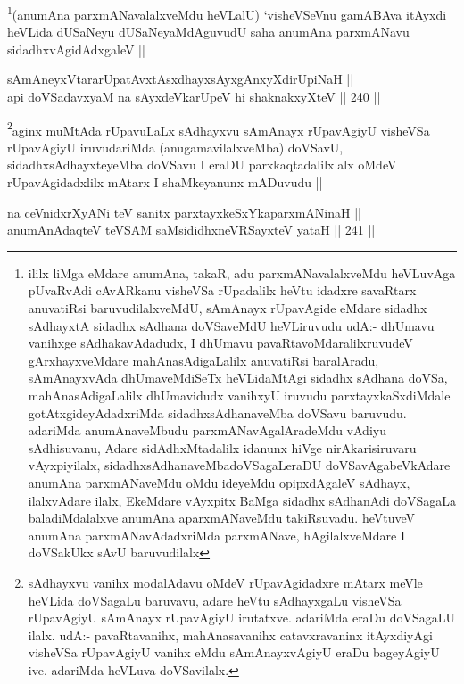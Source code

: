 \begin{artha}
\footnote{ililx liMga eMdare anumAna, takaR, adu parxmANavalalxveMdu heVLuvAga pUvaRvAdi cAvARkanu visheVSa rUpadalilx heVtu idadxre savaRtarx anuvatiRsi baruvudilalxveMdU, sAmAnayx rUpavAgide eMdare sidadhx sAdhayxtA sidadhx sAdhana doVSaveMdU heVLiruvudu udA:- dhUmavu vanihxge sAdhakavAdadudx, I dhUmavu pavaRtavoMdaralilxruvudeV gArxhayxveMdare mahAnasAdigaLalilx anuvatiRsi baralAradu, sAmAnayxvAda dhUmaveMdiSeTx heVLidaMtAgi sidadhx sAdhana doVSa, mahAnasAdigaLalilx dhUmavidudx vanihxyU iruvudu parxtayxkaSxdiMdale gotAtxgideyAdadxriMda sidadhxsAdhanaveMba doVSavu baruvudu. adariMda anumAnaveMbudu parxmANavAgalAradeMdu vAdiyu sAdhisuvanu, Adare sidAdhxMtadalilx idanunx hiVge nirAkarisiruvaru vAyxpiyilalx, sidadhxsAdhanaveMbadoVSagaLeraDU doVSavAgabeVkAdare anumAna parxmANaveMdu oMdu ideyeMdu opipxdAgaleV sAdhayx, ilalxvAdare ilalx, EkeMdare vAyxpitx BaMga sidadhx sAdhanAdi doVSagaLa baladiMdalalxve anumAna aparxmANaveMdu takiRsuvadu. heVtuveV anumAna parxmANavAdadxriMda parxmANave, hAgilalxveMdare I doVSakUkx sAvU baruvudilalx}(anumAna parxmANavalalxveMdu heVLalU) `visheVSeV\s nu gamABAva itAyxdi heVLida dUSaNeyu dUSaNeyaMdAguvudU saha anumAna parxmANavu sidadhxvAgidAdxgaleV ||
\end{artha}


\begin{shl}
sAmAneyxVtararUpatAvxtAsxdhayxsAyxgAnxyXdirUpiNaH || \\
api doVSadavxyaM na sAyxdeVkarUpeV hi shaknakxyXteV ||  240 ||  
\end{shl}

\begin{artha}
\footnote{sAdhayxvu vanihx modalAdavu oMdeV rUpavAgidadxre mAtarx meVle heVLida doVSagaLu baruvavu, adare heVtu sAdhayxgaLu visheVSa rUpavAgiyU sAmAnayx rUpavAgiyU irutatxve. adariMda eraDu doVSagaLU ilalx. udA:- pavaRtavanihx, mahAnasavanihx catavxravaninx itAyxdiyAgi visheVSa rUpavAgiyU vanihx eMdu sAmAnayxvAgiyU eraDu bageyAgiyU ive. adariMda heVLuva doVSavilalx.}aginx muMtAda rUpavuLaLx sAdhayxvu sAmAnayx rUpavAgiyU visheVSa rUpavAgiyU iruvudariMda (anugamavilalxveMba) doVSavU, sidadhxsAdhayxteyeMba doVSavu I eraDU parxkaqtadalilxlalx oMdeV rUpavAgidadxlilx mAtarx I shaMkeyanunx mADuvudu ||
\end{artha}

\begin{shl}
na ceVnidxrXyANi teV sanitx parxtayxkeSxYkaparxmANinaH || \\
anumAnAdaqteV teVSAM saMsididhxneVRSayxteV yataH ||  241 ||  
\end{shl}

